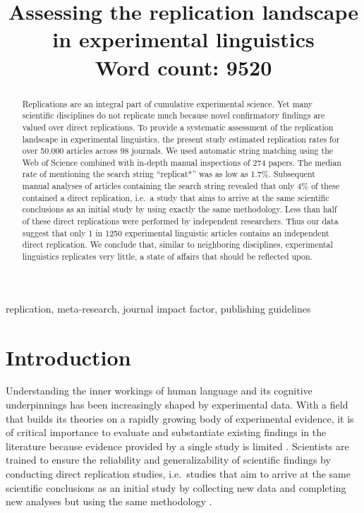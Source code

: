 \documentclass[cm,linguex]{glossa}
\title[Replication landscape in experimental linguistics]{Assessing the replication landscape in experimental linguistics\\ \bigskip \large Word count: 9520}
\author[Kobrock \& Roettger]{
    \spauthor{Kristina Kobrock\\
  \institute{University of Osnabrück}\\
  \small{\href{mailto:kristina.kobrock@uos.de}{\nolinkurl{kristina.kobrock@uos.de}}}
  }%
  \AND  \spauthor{Timo B. Roettger\\
  \institute{Universitetet i Oslo}\\
  \small{\href{mailto:timo.b.roettger@gmail.com}{\nolinkurl{timo.b.roettger@gmail.com}}}
  }%
  }
\begin{document}
\sffamily
\maketitle

\begin{abstract}
Replications are an integral part of cumulative experimental science. Yet many scientific disciplines do not replicate much because novel confirmatory findings are valued over direct replications. To provide a systematic assessment of the replication landscape in experimental linguistics, the present study estimated replication rates for over 50.000 articles across 98 journals. We used automatic string matching using the Web of Science combined with in-depth manual inspections of 274 papers. The median rate of mentioning the search string ``replicat*'' was as low as 1.7\%. Subsequent manual analyses of articles containing the search string revealed that only 4\% of these contained a direct replication, i.e.~a study that aims to arrive at the same scientific conclusions as an initial study by using exactly the same methodology. Less than half of these direct replications were performed by independent researchers. Thus our data suggest that only 1 in 1250 experimental linguistic articles contains an independent direct replication. We conclude that, similar to neighboring disciplines, experimental linguistics replicates very little, a state of affairs that should be reflected upon.
\end{abstract}

\begin{keywords}
  replication, meta-research, journal impact factor, publishing guidelines
\end{keywords}

\rmfamily

\hypertarget{introduction}{%
\section{Introduction}\label{introduction}}

Understanding the inner workings of human language and its cognitive underpinnings has been increasingly shaped by experimental data. With a field that builds its theories on a rapidly growing body of experimental evidence, it is of critical importance to evaluate and substantiate existing findings in the literature because evidence provided by a single study is limited \citep[e.g.,][]{amrhein2019inferential}. Scientists are trained to ensure the reliability and generalizability of scientific findings by conducting direct replication studies, i.e.~studies that aim to arrive at the same scientific conclusions as an initial study by collecting new data and completing new analyses but using the same methodology \citep[for a comprehensive overview of different terminological uses see][]{barba_terminologies_2018}.
\end{document}

